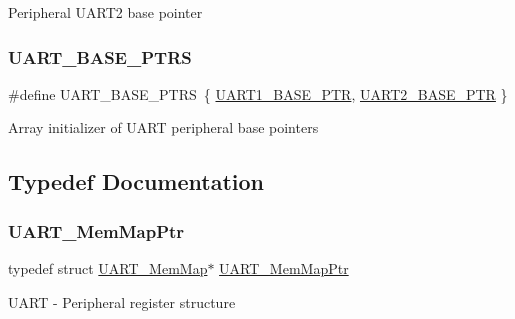 Peripheral U\+A\+R\+T2 base pointer \mbox{\label{group___u_a_r_t___peripheral_ga7b34a38b9492a1e1007b2f66383aef17}} 
\subsubsection{\texorpdfstring{U\+A\+R\+T\+\_\+\+B\+A\+S\+E\+\_\+\+P\+T\+RS}{UART\_BASE\_PTRS}}
{\footnotesize\ttfamily \#define U\+A\+R\+T\+\_\+\+B\+A\+S\+E\+\_\+\+P\+T\+RS~\{ \hyperlink{group___u_a_r_t___peripheral_gafb5b1236c1cdf2d9a6464251b791030c}{U\+A\+R\+T1\+\_\+\+B\+A\+S\+E\+\_\+\+P\+TR}, \hyperlink{group___u_a_r_t___peripheral_ga75ca2ea4e490b3c1c7aa55fc9c25cd37}{U\+A\+R\+T2\+\_\+\+B\+A\+S\+E\+\_\+\+P\+TR} \}}

Array initializer of U\+A\+RT peripheral base pointers 

\subsection{Typedef Documentation}
\mbox{\label{group___u_a_r_t___peripheral_ga306cf44b593fadbb29a065f42e3f68f0}} 
\subsubsection{\texorpdfstring{U\+A\+R\+T\+\_\+\+Mem\+Map\+Ptr}{UART\_MemMapPtr}}
{\footnotesize\ttfamily typedef struct \hyperlink{struct_u_a_r_t___mem_map}{U\+A\+R\+T\+\_\+\+Mem\+Map}$\ast$ \hyperlink{group___u_a_r_t___peripheral_ga306cf44b593fadbb29a065f42e3f68f0}{U\+A\+R\+T\+\_\+\+Mem\+Map\+Ptr}}

U\+A\+RT -\/ Peripheral register structure 